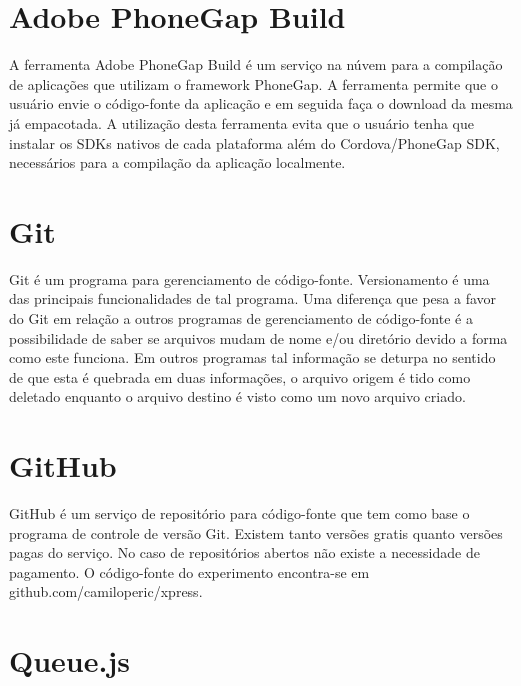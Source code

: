 \section{Adobe PhoneGap Build}
A ferramenta Adobe PhoneGap Build é um serviço na núvem para a compilação de aplicações que utilizam o framework PhoneGap. A ferramenta permite que o usuário envie o código-fonte da aplicação e em seguida faça o download da mesma já empacotada. A utilização desta ferramenta evita que o usuário tenha que instalar os SDKs nativos de cada plataforma além do Cordova/PhoneGap SDK, necessários para a compilação da aplicação localmente.

\section{Git}
Git é um programa para gerenciamento de código-fonte. Versionamento é uma das principais funcionalidades de tal programa. Uma diferença que pesa a favor do Git em relação a outros programas de gerenciamento de  código-fonte é a possibilidade de saber se arquivos mudam de nome e/ou diretório devido a forma como este funciona. Em outros programas tal informação se deturpa no sentido de que esta é quebrada em duas informações, o arquivo origem é tido como deletado enquanto o arquivo destino é visto como um novo arquivo criado.

\section{GitHub}
GitHub é um serviço de repositório para código-fonte que tem como base o programa de controle de versão Git. Existem tanto versões gratis quanto versões pagas do serviço. No caso de repositórios abertos não existe a necessidade de pagamento. O código-fonte do experimento encontra-se em github.com/camiloperic/xpress.

\section{Queue.js}
